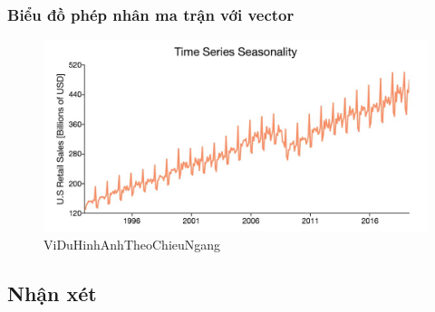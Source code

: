 \newpage

 
\begin{landscape} 
\subsubsection{Biểu đồ phép nhân ma trận với vector}


\begin{figure}[h] %
    \centering
    \includegraphics[width=1\textwidth]{pictures/ts-pp-seasonality.jpg} %
    \caption{ViDuHinhAnhTheoChieuNgang} %
    \label{pictures:nghia12} %
\end{figure}

\end{landscape}

\subsection{Nhận xét}
\lipsum[1]


